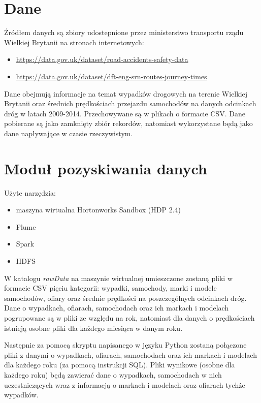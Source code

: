 \documentclass{article}
\begin{document}

\section{Dane}

Źródłem danych są zbiory udostepnione przez ministerstwo transportu rządu Wielkiej Brytanii na stronach internetowych:
\begin{itemize}
    \item \url{https://data.gov.uk/dataset/road-accidents-safety-data}
    \item \url{https://data.gov.uk/dataset/dft-eng-srn-routes-journey-times}
\end{itemize}
Dane obejmują informacje na temat wypadków drogowych na terenie Wielkiej Brytanii oraz średnich prędkościach przejazdu samochodów na danych odcinkach dróg w latach 2009-2014. Przechowywane są w plikach o formacie CSV. Dane pobierane są jako zamknięty zbiór rekordów, natomiast wykorzystane będą jako dane napływające w czasie rzeczywistym. 



\section{Moduł pozyskiwania danych}

Użyte narzędzia:
\begin{itemize}
    \item maszyna wirtualna Hortonworks Sandbox (HDP 2.4)
    \item Flume
    \item Spark
    \item HDFS
\end{itemize}

W katalogu \textit{rawData} na maszynie wirtualnej umieszczone zostaną pliki w formacie CSV pięciu kategorii: wypadki, samochody, marki i modele samochodów, ofiary oraz średnie prędkości na poszczególnych odcinkach dróg. Dane o wypadkach, ofiarach, samochodach oraz ich markach i modelach pogrupowane są w pliki ze względu na rok, natomiast dla danych o prędkościach istnieją osobne pliki dla każdego miesiąca w danym roku.

Następnie za pomocą skryptu napisanego w języku Python zostaną połączone pliki z danymi o wypadkach, ofiarach, samochodach oraz ich markach i modelach dla każdego roku (za pomocą instrukcji SQL). Pliki wynikowe (osobne dla każdego roku) będą zawierać dane o wypadkach, samochodach w nich uczestniczących wraz z informacją o markach i modelach oraz ofiarach tychże wypadków.
\end{document}
